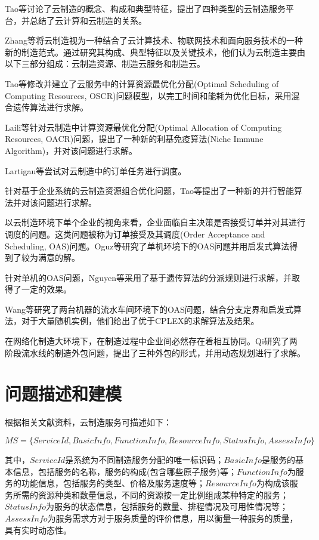 \documentclass[UTF8]{ctexart}
\begin{document}
Tao等\cite{Tao2011}讨论了云制造的概念、构成和典型特征，提出了四种类型的云制造服务平台，并总结了云计算和云制造的关系。

Zhang等\cite{Zhang2014}将云制造视为一种结合了云计算技术、物联网技术和面向服务技术的一种新的制造范式。通过研究其构成、典型特征以及关键技术，他们认为云制造主要由以下三部分组成：云制造资源、制造云服务和制造云。

Tao等\cite{Tao2014}修改并建立了云服务中的计算资源最优化分配(Optimal Scheduling of Computing Resources, OSCR)问题模型，以完工时间和能耗为优化目标，采用混合遗传算法进行求解。

Laili等\cite{Laili2012}针对云制造中计算资源最优化分配(Optimal Allocation of Computing
Resources, OACR)问题，提出了一种新的利基免疫算法(Niche Immune Algorithm)，并对该问题进行求解。

Lartigau等\cite{6227791}尝试对云制造中的订单任务进行调度。

针对基于企业系统的云制造资源组合优化问题，Tao等\cite{6376181}提出了一种新的并行智能算法并对该问题进行求解。

以云制造环境下单个企业的视角来看，企业面临自主决策是否接受订单并对其进行调度的问题。这类问题被称为订单接受及其调度(Order Acceptance and Scheduling, OAS)问题。Oguz等\cite{Og2010}研究了单机环境下的OAS问题并用启发式算法得到了较为满意的解。

针对单机的OAS问题，Nguyen等\cite{Nguyen2015}采用了基于遗传算法的分派规则进行求解，并取得了一定的效果。

Wang等\cite{Wang2013}研究了两台机器的流水车间环境下的OAS问题，结合分支定界和启发式算法，对于大量随机实例，他们给出了优于CPLEX的求解算法及结果。

在网络化制造大环境下，在制造过程中企业间必然存在着相互协同。Qi\cite{Qi2011}研究了两阶段流水线的制造外包问题，提出了三种外包的形式，并用动态规划进行了求解。

\section{问题描述和建模}
根据相关文献资料，云制造服务可描述如下：

$MS = \{ServiceId, BasicInfo, FunctionInfo, ResourceInfo, StatusInfo, AssessInfo\}$

其中，$ServiceId$是系统为不同制造服务分配的唯一标识码；$BasicInfo$是服务的基本信息，包括服务的名称，服务的构成(包含哪些原子服务)等；$FunctionInfo$为服务的功能信息，包括服务的类型、价格及服务速度等；$ResourceInfo$为构成该服务所需的资源种类和数量信息，不同的资源按一定比例组成某种特定的服务；$StatusInfo$为服务的状态信息，包括服务的数量、排程情况及可用性情况等；$AssessInfo$为服务需求方对于服务质量的评价信息，用以衡量一种服务的质量，具有实时动态性。
\end{document}
